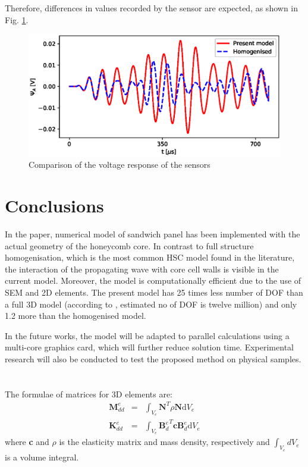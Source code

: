 \documentclass[a4paper,12pt]{article}
\newcommand{\rmd}{\mathrm{d}}
\begin{document}
{Therefore, differences in values recorded by the sensor are expected, as shown in Fig. \ref{fig:voltage}.

\begin{figure}
	\begin{center}
		\includegraphics[width=1\linewidth]{../../../figures/eps/voltage.eps}
	\end{center}
	\caption{Comparison of the voltage response of the sensors}
	\label{fig:voltage}
\end{figure}

\section{Conclusions}
\label{sec:conc}
In the paper, numerical model of sandwich panel has been implemented with the actual geometry of the honeycomb core.
In contrast to  full structure homogenisation, which is the most common HSC model found in the literature, the interaction of the propagating wave with core cell walls is visible in the current model.
Moreover, the model is computationally efficient due to the use of SEM and 2D elements.
The present model has 25 times less number of DOF than a full 3D model (according to \cite{kudela2016parallel}, estimated no of DOF is twelve million) and only 1.2 more than the homogenised model.

In the future works, the model will be adapted to parallel calculations using a multi-core graphics card, which will further reduce solution time. Experimental research will also be conducted to test the proposed method on physical samples.
\appendix
\section{}
\label{app:matrices}
The formulae of matrices for 3D elements are:
\begin{eqnarray}
\textbf{M}_{dd}^e & = & \int_{V_e}\textbf{N}^T\rho \textbf{N}\rmd V_e\\
\textbf{K}_{dd}^e & = & \int_{V_e}{\textbf{B}_d^e}^T\textbf{c}\textbf{B}_d^e\rmd V_e
\end{eqnarray}
where \textbf{c} and \(\rho\) is the elasticity matrix and mass density, 
respectively and \(\int_{V_e}dV_e\) is a volume integral.

}
\end{document}
